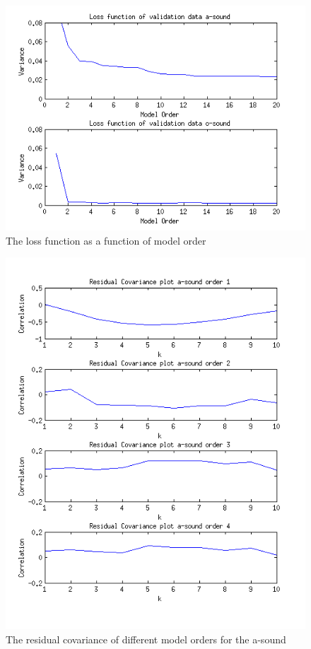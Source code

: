\documentclass[12pt]{article}
\begin{document}
\begin{figure}[H]
  \centering
  \includegraphics[width=14cm]{loss_function_validation.png}
  \caption{
    \label{loss_function}
    The loss function as a function of model order}
\end{figure}

\begin{figure}[H]
  \centering
  \includegraphics[width=14cm]{residual_covariance_a.png}
  \caption{The residual covariance of different model orders for the a-sound\label{res_cov_a}}
\end{figure}
\end{document}

